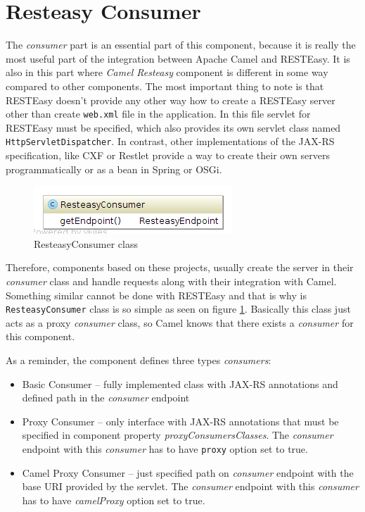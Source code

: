 \documentclass[12pt,final,oneside]{fithesis2}
\begin{document}
\section{Resteasy Consumer}\label{consumer}
The \textit{consumer} part is an essential part of this component, because it is really the most useful part of the integration between Apache Camel and RESTEasy. It is also in this part where \textit{Camel Resteasy} component is different in some way compared to other components. The most important thing to note is that RESTEasy doesn't provide any other way how to create a RESTEasy server other than create \texttt{web.xml} file in the application. In this file  servlet for RESTEasy must be specified, which also provides its own servlet class named \texttt{HttpServletDispatcher}. In contrast, other implementations of the JAX-RS specification, like CXF or Restlet provide a way to create their own servers programmatically or as a bean in Spring or OSGi.

\begin{figure}[!h]
\centering
\includegraphics[width=0.6\linewidth]{images/consumer.png}
\caption{ResteasyConsumer class}
\label{fig-consumer}
\end{figure}

Therefore, components based on these projects, usually create the server in their \textit{consumer} class and handle requests along with their integration with Camel. Something similar cannot be done with RESTEasy and that is why is \texttt{ResteasyConsumer} class is so simple as seen on figure \ref{fig-consumer}. Basically this class just acts as a proxy \textit{consumer} class, so Camel knows that there exists a \textit{consumer} for this component.

As a reminder, the component defines three types \textit{consumers}:
\begin{itemize}
\item
Basic Consumer  -- fully implemented class with JAX-RS annotations and defined path in the \textit{consumer} endpoint

\item
Proxy Consumer -- only interface with JAX-RS annotations that must be specified in component property \textit{proxyConsumersClass\-es}. The \textit{consumer} endpoint with this \textit{consumer} has to have \texttt{proxy} option set to true. 

\item
Camel Proxy Consumer -- just specified path on \textit{consumer} endpoint with the base URI provided by the servlet. The \textit{consumer} endpoint with this \textit{consumer} has to have \textit{camelProxy} option set to true. 
\end{itemize}
\end{document}
